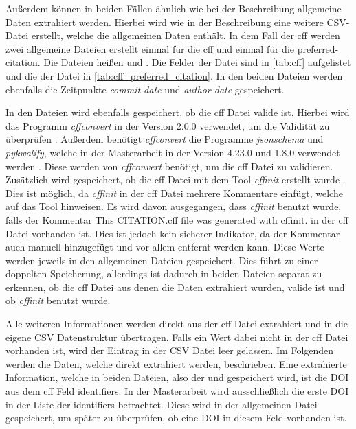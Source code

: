 Außerdem können in beiden Fällen ähnlich wie bei der Beschreibung allgemeine Daten extrahiert werden.
Hierbei wird wie in der Beschreibung eine weitere CSV-Datei erstellt, welche die allgemeinen Daten enthält.
In dem Fall der \gls{cff} werden zwei allgemeine Dateien erstellt einmal für die \gls{cff} und einmal für die \glqq preferred-citation\grqq{}.
Die Dateien heißen  und .
Die Felder der  Datei sind in \autoref{tab:cff} aufgelistet und die der  Datei in \autoref{tab:cff_preferred_citation}.
In den beiden Dateien werden ebenfalls die Zeitpunkte \emph{commit date} und \emph{author date} gespeichert.

In den Dateien wird ebenfalls gespeichert, ob die \gls{cff} Datei valide ist.
Hierbei wird das Programm \emph{cffconvert} in der Version 2.0.0 verwendet, um die Validität zu überprüfen \autocite{spaaks_cffconvert_2021}.
Außerdem benötigt \emph{cffconvert} die Programme \emph{jsonschema} und \emph{pykwalify}, welche in der Masterarbeit in der Version 4.23.0 und 1.8.0 verwendet werden \autocites{noauthor_python-jsonschemajsonschema_2024}{grokzen_grokzenpykwalify_2024}.
Diese werden von \emph{cffconvert} benötigt, um die \gls{cff} Datei zu validieren.
Zusätzlich wird gespeichert, ob die \gls{cff} Datei mit dem Tool \emph{cffinit} erstellt wurde \autocite{spaaks_cffinit_2023}.
Dies ist möglich, da \emph{cffinit} in der \gls{cff} Datei mehrere Kommentare einfügt, welche auf das Tool hinweisen.
Es wird davon ausgegangen, dass \emph{cffinit} benutzt wurde, falls der Kommentar \glqq This CITATION.cff file was generated with cffinit.\grqq{} in der \gls{cff} Datei vorhanden ist.
Dies ist jedoch kein sicherer Indikator, da der Kommentar auch manuell hinzugefügt und vor allem entfernt werden kann.
Diese Werte werden jeweils in den allgemeinen Dateien gespeichert.
Dies führt zu einer doppelten Speicherung, allerdings ist dadurch in beiden Dateien separat zu erkennen, ob die \gls{cff} Datei aus denen die Daten extrahiert wurden, valide ist und ob \emph{cffinit} benutzt wurde.

Alle weiteren Informationen werden direkt aus der \gls{cff} Datei extrahiert und in die eigene CSV Datenstruktur übertragen.
Falls ein Wert dabei nicht in der \gls{cff} Datei vorhanden ist, wird der Eintrag in der CSV Datei leer gelassen.
Im Folgenden werden die Daten, welche direkt extrahiert werden, beschrieben.
Eine extrahierte Information, welche in beiden Dateien, also der  und  gespeichert wird, ist die DOI aus dem \gls{cff} Feld \glqq identifiers\grqq{}.
In der Masterarbeit wird ausschließlich die erste DOI in der Liste der \glqq identifiers\grqq{} betrachtet.
Diese wird in der allgemeinen Datei gespeichert, um später zu überprüfen, ob eine DOI in diesem Feld vorhanden ist.

